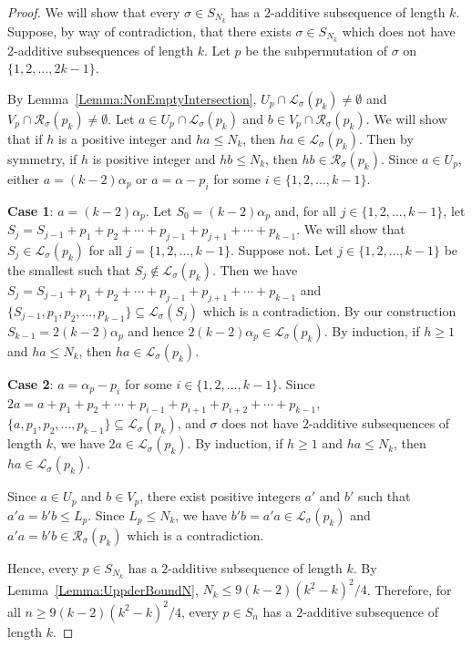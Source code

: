 \documentclass[11pt]{article}
\theoremstyle{definition}
\newcommand{\cl}{\mathcal{L}}
\newcommand{\crr}{\mathcal{R}}
\begin{document}
\begin{proof}
We will show that every $\sigma\in S_{N_k}$ has a 2-additive subsequence of length $k$. Suppose, by way of contradiction, that there exists $\sigma\in S_{N_k}$ which does not have 2-additive subsequences of length $k$. Let $p$ be the subpermutation of $\sigma$ on $\{1,2,\ldots,2k-1\}$.

By Lemma~\ref{Lemma:NonEmptyIntersection}, $U_p\cap\mathcal{L}_\sigma(p_k)\neq\emptyset$ and $V_p\cap\mathcal{R}_\sigma(p_k)\neq\emptyset$. Let $a\in U_p\cap \cl_\sigma(p_{k})$ and $b\in V_p\cap \crr_\sigma(p_{k})$. We will show that if $h$ is a positive integer and $ha\leq N_k$, then $h a\in \cl_\sigma(p_{k})$. Then by symmetry, if $h$ is positive integer and $hb\leq N_k$, then $h b\in \mathcal{R}_\sigma(p_{k})$. Since $a\in U_p$, either $a=(k-2)\alpha_p$ or $a=\alpha-p_i$ for some $i\in\{1,2,\ldots,k-1\}$.

\textbf{Case 1}: $a=(k-2)\alpha_p$. Let $S_0=(k-2)\alpha_p$ and, for all $j\in\{1,2,\ldots,k-1\}$, let $S_j=S_{j-1}+p_1+p_2+\cdots+p_{j-1}+p_{j+1}+\cdots+p_{k-1}$. We will show that $S_j\in \cl_\sigma(p_{k})$ for all $j=\{1,2,\ldots,k-1\}$. Suppose not. Let $j\in\{1,2,\ldots,k-1\}$ be the smallest such that $S_j\notin \cl_\sigma(p_{k})$. Then we have $S_j=S_{j-1}+p_1+p_2+\cdots+p_{j-1}+p_{j+1}+\cdots+p_{k-1}$ and $\{S_{j-1},p_1,p_2,\ldots,p_{k-1}\}\subseteq\cl_\sigma(S_j)$ which is a contradiction. By our construction $S_{k-1}=2(k-2)\alpha_p$ and hence $2(k-2)\alpha_p\in\cl_\sigma(p_{k})$. By induction, if $h\geq1$ and $ha\leq N_k$, then $ha\in\mathcal{L}_\sigma(p_k)$.

\textbf{Case 2}: $a=\alpha_p-p_i$ for some $i\in\{1,2,\ldots,k-1\}$. Since $2a=a+p_1+p_2+\cdots+p_{i-1}+p_{i+1}+p_{i+2}+\cdots+p_{k-1}$, $\{a,p_1,p_2,\ldots,p_{k-1}\}\subseteq\cl_\sigma(p_k)$, and $\sigma$ does not have $2$-additive subsequences of length $k$, we have $2a\in\mathcal{L}_\sigma(p_k)$. By induction, if $h\geq1$ and $ha\leq N_k$, then $ha\in\mathcal{L}_\sigma(p_k)$.

Since $a\in U_p$ and $b\in V_p$, there exist positive integers $a'$ and $b'$ such that $a'a=b'b\leq L_p$. Since $L_p\leq N_k$, we have $b'b=a'a\in \cl_\sigma(p_{k})$ and $a'a=b'b\in \crr_\sigma(p_{k})$ which is a contradiction.

Hence, every $p\in S_{N_k}$ has a $2$-additive subsequence of length $k$. By Lemma~\ref{Lemma:UppderBoundN}, $N_k\leq 9(k-2)(k^2-k)^2/4$. Therefore, for all $n\geq 9(k-2)(k^2-k)^2/4$, every $p\in S_n$ has a $2$-additive subsequence of length $k$.
\end{proof}
\end{document}

